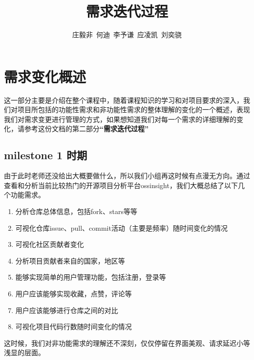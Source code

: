 \documentclass[a4paper,20pt]{article}
\title{需求迭代过程}
\author{庄毅非\ 何迪\ 李予谦\ 应凌凯\ 刘奕骁}
\begin{document}
\maketitle


\section{需求变化概述}
这一部分主要是介绍在整个课程中，随着课程知识的学习和对项目要求的深入，我们对项目所包括的功能性需求和非功能性需求的整体理解的变化的一个概述，表现我们对需求变更进行管理的方式，如果想知道我们对每一个需求的详细理解的变化，请参考这份文档的第二部分\textbf{“需求迭代过程”}
\subsection{milestone 1 时期}
由于此时老师还没给出大概要做什么，所以我们小组再这时候有点漫无方向。通过查看和分析当前比较热门的开源项目分析平台ossinsight，我们大概总结了以下几个功能需求。
\begin{enumerate}
    \item 分析仓库总体信息，包括fork、stars等等
    \item 可视化仓库issue、pull、commit活动（主要是频率）随时间变化的情况
    \item 可视化社区贡献者变化
    \item 分析项目贡献者来自的国家，地区等
    \item 能够实现简单的用户管理功能，包括注册，登录等
    \item 用户应该能够实现收藏，点赞，评论等
    \item 用户应该能够进行仓库之间的对比
    \item 可视化项目代码行数随时间变化的情况
\end{enumerate}
\tab 这时候，我们对非功能需求的理解还不深刻，仅仅停留在界面美观、请求延迟小等浅显的层面。
\end{document}
